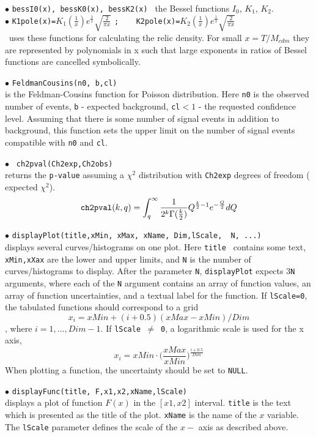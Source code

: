 \documentclass[12pt,a4paper]{article}
\begin{document}
\noindent$\bullet$ \verb|bessI0(x), bessK0(x), bessK2(x) | the Bessel functions $I_0$,  $K_1$,
$K_2$.\\ 

\noindent$\bullet$ \verb|K1pole(x)=|$K_1(\frac{1}{x}) e^\frac{1}{x}
\sqrt{\frac{2}{\pi x}}$ \verb|;    K2pole(x)=|$K_2(\frac{1}{x}) e^\frac{1}{x}
\sqrt{\frac{2}{\pi x}}$   \\
\micro\ uses these functions for calculating the  relic density. For
small $x=T/M_{cdm}$ they are represented by polynomials in x such that  large exponents
in ratios of  Bessel functions  are cancelled symbolically.  


\noindent$\bullet$ \verb|FeldmanCousins(n0, b,cl)|\\
is the Feldman-Cousins \cite{Feldman:1997qc}  function for Poisson distribution.
Here {\tt n0} is the observed number of events, {\tt b} -  expected background,
\verb|cl|$ < 1 $ - the requested confidence level. Assuming that  
there is some number of signal events in addition to background, this function sets the upper limit on the number 
of signal events compatible with {\tt n0}  and {\tt cl}.

\noindent$\bullet$ \verb| ch2pval(Ch2exp,Ch2obs)|\\ 
returns the {\tt p-value} assuming a $\chi^2$ distribution with  {\tt Ch2exp} degrees
of freedom ( expected  $\chi^2$).  
$$   
{  \verb|ch2pval|(k,q)=\int_q^\infty  \frac{1}{2^k \Gamma(\frac{k}{2})} Q^{\frac{k}{2}-1}
e^{-\frac{Q}{2}} dQ } $$   

\noindent$\bullet$ \verb|displayPlot(title,xMin, xMax, xName, Dim,lScale,  N, ...)|\\
displays several  curves/histograms on one plot.  Here {\tt title  } contains some text, {\tt
xMin,xXax} are the lower and upper limits,   and {\tt N} is the number of
curves/histograms  to display.  After the parameter {\tt N}, {\tt displayPlot} expects 3{\tt N} arguments, where each of the {\tt N} argument contains an array  of function values, an array  of function uncertainties, and  a textual label for the function.
If {\tt lScale=0}, the tabulated functions should correspond to a grid
$$x_i=xMin+(i+0.5)(xMax-xMin)/Dim$$, where $i=1,...,Dim-1$. If {\tt lScale $\neq$ 0}, a logarithmic scale is used for the x axis,  $$x_i=xMin\cdot \big(\frac{xMax}{xMin}\big)^\frac{i+0.5}{Dim}$$
 When  plotting a function, 
the uncertainty should be set to {\tt NULL}.    


\noindent$\bullet$ \verb|displayFunc(title, F,x1,x2,xName,lScale)|\\
displays a plot of function $F(x)$ in the  $[x1,x2]$ interval. \verb|title| is the text 
which is presented as the title of the plot. {\tt xName} is the name of the $x$ variable. The {\tt lScale} parameter
defines the scale of the $x-$ axis as  described above.
\end{document}

